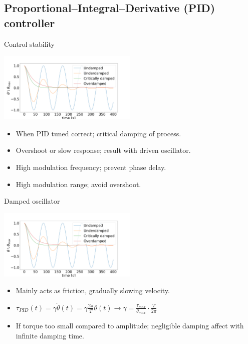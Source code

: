 \documentclass{beamer}
\begin{document}
\subsection{Proportional–Integral–Derivative (PID) controller}


\begin{frame}{Control stability}
	\begin{center}		
		\includegraphics[width=0.5\textwidth,keepaspectratio]{damp.png}
	\end{center}
	\begin{itemize}		
		\item When PID tuned correct; critical damping of process.

		\item Overshoot or slow response; result with driven oscillator.
		\item High modulation frequency; prevent phase delay.
		\item High modulation range; avoid overshoot.
		
		
	\end{itemize}
\end{frame}

\begin{frame}{Damped oscillator}
	\begin{center}		
		\includegraphics[width=0.5\textwidth,keepaspectratio]{damp.png}
	\end{center}
	\begin{itemize}		
		
		\item Mainly acts as friction, gradually slowing velocity.
		\item $\tau_{PID}(t) =  \gamma\dot{\theta}(t) =  \gamma\frac{2\pi}{T} \theta( t) \rightarrow \gamma  =\frac{\tau_{max}}{\theta_{max}}\cdot \frac{ T}{2\pi} $
		\pause
		\item If torque too small compared to amplitude; negligible damping affect with infinite damping time. 
		
	\end{itemize}
\end{frame}
\end{document}
